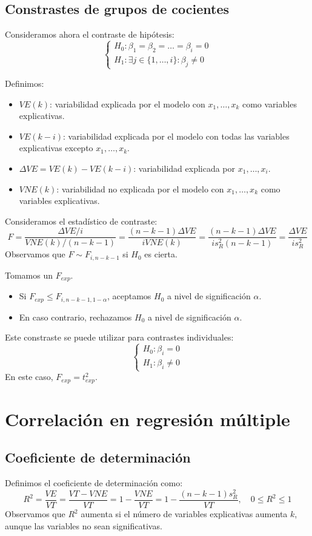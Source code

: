 \subsection*{Constrastes de grupos de cocientes}
Consideramos ahora el contraste de hipótesis:
$$\begin{cases}
        H_0: \beta_1 = \beta_2 = \dots = \beta_i = 0 \\
        H_1: \exists j \in \{1, \dots, i\} : \beta_j \neq 0
    \end{cases}$$

Definimos:
\begin{itemize}
    \item $VE(k)$: variabilidad explicada por el modelo con $x_1, \dots, x_k$ como variables explicativas.
    \item $VE(k-i)$: variabilidad explicada por el modelo con todas las variables explicativas excepto $x_1, \dots, x_k$.
    \item $\Delta VE = VE(k) - VE(k-i)$: variabilidad explicada por $x_1, \dots, x_i$.
    \item $VNE(k)$: variabilidad no explicada por el modelo con $x_1, \dots, x_k$ como variables explicativas.
\end{itemize}

Consideramos el estadístico de contraste:
$$F = \frac{\Delta VE / i}{VNE(k) / (n-k-1)} = \frac{(n-k-1)\Delta VE}{iVNE(k)} = \frac{(n-k-1)\Delta VE}{is_R^2(n-k-1)} = \frac{\Delta VE}{is_R^2}$$
Observamos que $F \sim F_{i, n-k-1}$ si $H_0$ es cierta.

Tomamos un $F_{exp}$.
\begin{itemize}
    \item Si $F_{exp} \leq F_{i, n-k-1, 1-\alpha}$, aceptamos $H_0$ a nivel de significación $\alpha$.
    \item En caso contrario, rechazamos $H_0$ a nivel de significación $\alpha$.
\end{itemize}

Este constraste se puede utilizar para contrastes individuales:
$$\begin{cases}
        H_0: \beta_i = 0 \\
        H_1: \beta_i \neq 0
    \end{cases}$$
En este caso, $F_{exp} = t_{exp}^2$.

\section{Correlación en regresión múltiple}
\subsection*{Coeficiente de determinación}
Definimos el coeficiente de determinación como:
$$R^2 = \frac{VE}{VT} = \frac{VT - VNE}{VT} = 1 - \frac{VNE}{VT} = 1 - \frac{(n-k-1)s_R^2}{VT}, \quad 0 \leq R^2 \leq 1$$
Observamos que $R^2$ aumenta si el número de variables explicativas aumenta $k$, aunque las variables no sean significativas.

